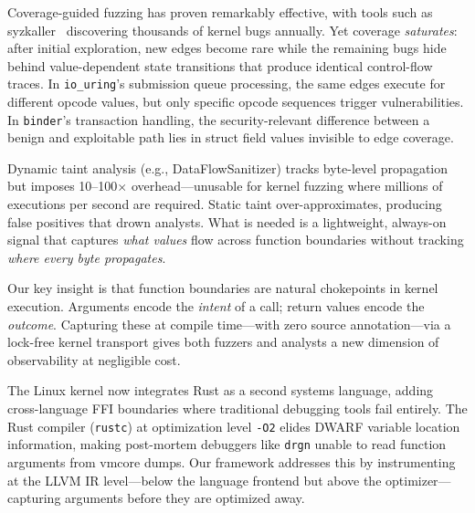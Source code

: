 \documentclass{ndss}
\begin{document}
Coverage-guided fuzzing has proven remarkably effective, with tools such as
syzkaller~\cite{vyukov2015syzkaller} discovering thousands of kernel bugs
annually. Yet coverage \emph{saturates}: after initial exploration, new edges
become rare while the remaining bugs hide behind value-dependent state
transitions that produce identical control-flow traces. In
\texttt{io\_uring}'s submission queue processing, the same edges execute for
different opcode values, but only specific opcode sequences trigger
vulnerabilities. In \texttt{binder}'s transaction handling, the
security-relevant difference between a benign and exploitable path lies in
struct field values invisible to edge coverage.

Dynamic taint analysis (e.g., DataFlowSanitizer) tracks byte-level propagation
but imposes 10--100$\times$ overhead---unusable for kernel fuzzing where
millions of executions per second are required. Static taint over-approximates,
producing false positives that drown analysts. What is needed is a lightweight,
always-on signal that captures \emph{what values} flow across function
boundaries without tracking \emph{where every byte propagates}.

Our key insight is that function boundaries are natural chokepoints in kernel
execution. Arguments encode the \emph{intent} of a call; return values encode
the \emph{outcome}. Capturing these at compile time---with zero source
annotation---via a lock-free kernel transport gives both fuzzers and analysts a
new dimension of observability at negligible cost.

The Linux kernel now integrates Rust as a second systems language, adding
cross-language FFI boundaries where traditional debugging tools fail entirely.
The Rust compiler (\texttt{rustc}) at optimization level \texttt{-O2} elides
DWARF variable location information, making post-mortem debuggers like
\texttt{drgn} unable to read function arguments from vmcore dumps. Our
framework addresses this by instrumenting at the LLVM IR level---below the
language frontend but above the optimizer---capturing arguments before they are
optimized away.
\end{document}
